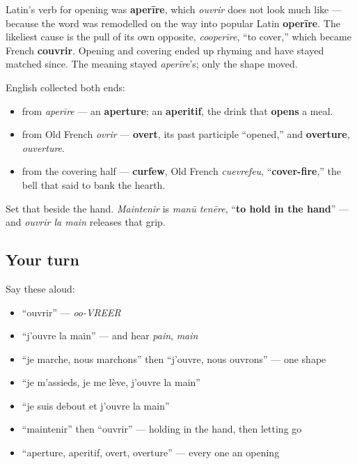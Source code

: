 \begin{cousinweb}
Latin's verb for opening was \textbf{aperīre}, which \emph{ouvrir} does not look much like — because the word was remodelled on the way into popular Latin \textbf{operīre}. The likeliest cause is the pull of its own opposite, \emph{cooperīre}, \textquotedblleft{}to cover,\textquotedblright{} which became French \textbf{couvrir}. Opening and covering ended up rhyming and have stayed matched since. The meaning stayed \emph{aperīre}'s; only the shape moved.

English collected both ends:

\begin{itemize}
\raggedright
  \item from \emph{aperīre} — an \textbf{aperture}; an \textbf{aperitif}, the drink that \textbf{opens} a meal.
  \item from Old French \emph{ovrir} — \textbf{overt}, its past participle \textquotedblleft{}opened,\textquotedblright{} and \textbf{overture}, \emph{ouverture}.
  \item from the covering half — \textbf{curfew}, Old French \emph{cuevrefeu}, \textquotedblleft{}\textbf{cover-fire},\textquotedblright{} the bell that said to bank the hearth.
\end{itemize}

Set that beside the hand. \emph{Maintenir} is \emph{manū tenēre}, \textquotedblleft{}\textbf{to hold in the hand}\textquotedblright{} — and \emph{ouvrir la main} releases that grip.
\end{cousinweb}

\subsection*{Your turn}
Say these aloud:

\begin{itemize}
\raggedright
  \item \textquotedblleft{}ouvrir\textquotedblright{} — \emph{oo-VREER}
  \item \textquotedblleft{}j'ouvre la main\textquotedblright{} — and hear \emph{pain}, \emph{main}
  \item \textquotedblleft{}je marche, nous marchons\textquotedblright{} then \textquotedblleft{}j'ouvre, nous ouvrons\textquotedblright{} — one shape
  \item \textquotedblleft{}je m'assieds, je me lève, j'ouvre la main\textquotedblright{}
  \item \textquotedblleft{}je suis debout et j'ouvre la main\textquotedblright{}
  \item \textquotedblleft{}maintenir\textquotedblright{} then \textquotedblleft{}ouvrir\textquotedblright{} — holding in the hand, then letting go
  \item \textquotedblleft{}aperture, aperitif, overt, overture\textquotedblright{} — every one an opening
\end{itemize}

